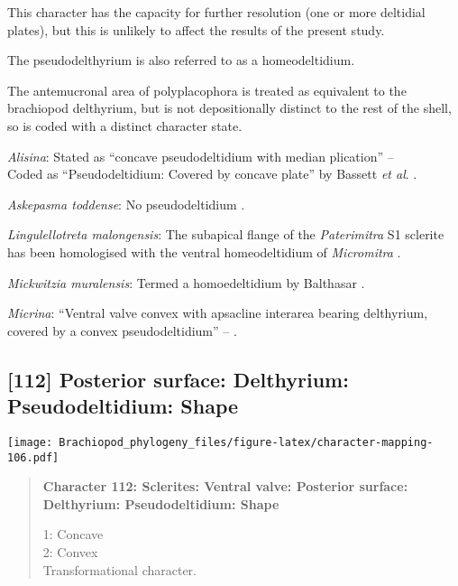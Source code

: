 \documentclass[openany]{book}
\theoremstyle{definition}
\theoremstyle{definition}
\theoremstyle{definition}
\theoremstyle{remark}
\begin{document}
This character has the capacity for further resolution (one or more
deltidial plates), but this is unlikely to affect the results of the
present study.

The pseudodelthyrium is also referred to as a homeodeltidium.

The antemucronal area of polyplacophora is treated as equivalent to the
brachiopod delthyrium, but is not depositionally distinct to the rest of
the shell, so is coded with a distinct character state.

\hypertarget{Alisina-coding-111}{}
\emph{Alisina}: Stated as ``concave pseudodeltidium with median
plication'' -- \citet{Williams2000LinguliformeaCraniiformea}\\
Coded as ``Pseudodeltidium: Covered by concave plate'' by Bassett
\emph{et al}. \citeyearpar{Bassett2001Functionalmorphology}.

\hypertarget{Askepasma_toddense-coding-111}{}
\emph{Askepasma toddense}: No pseudodeltidium
\citep[p.~153]{Williams2000LinguliformeaCraniiformea}.

\hypertarget{Lingulellotreta_malongensis-coding-111}{}
\emph{Lingulellotreta malongensis}: The subapical flange of the
\emph{Paterimitra} S1 sclerite has been homologised with the ventral
homeodeltidium of \emph{Micromitra} \citep{Larsson2014iPaterimitra}.

\hypertarget{Mickwitzia_muralensis-coding-111}{}
\emph{Mickwitzia muralensis}: Termed a homoedeltidium by Balthasar
\citeyearpar{Balthasar2004Shellstructure}.

\hypertarget{Micrina-coding-111}{}
\emph{Micrina}: ``Ventral valve convex with apsacline interarea bearing
delthyrium, covered by a convex pseudodeltidium'' --
\citet{Holmer2008TheEarly}.

\subsection*{{[}112{]} Posterior surface: Delthyrium: Pseudodeltidium:
Shape}\label{posterior-surface-delthyrium-pseudodeltidium-shape}

\texttt{[image: Brachiopod\_phylogeny\_files/figure-latex/character-mapping-106.pdf]}

\begin{quote}
\textbf{Character 112: Sclerites: Ventral valve: Posterior surface:
Delthyrium: Pseudodeltidium: Shape}

1: Concave\\
2: Convex\\
Transformational character.
\end{quote}
\end{document}

